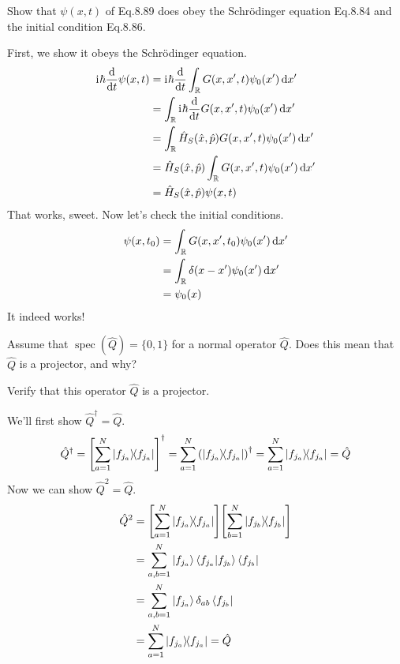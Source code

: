 \documentclass[boxes,pages]{homework}
\makeatletter
\newcommand{\iu}{\mathrm{i}\mkern1mu}
\newcommand{\herm}[1]{{{#1}^\dagger}}
\newcommand{\R}{\mathbb{R}}
\DeclareMathOperator{\spec}{spec}
\numberwithin{@problem}{section}
\makeatother
\begin{document}
\setcounter{section}{8}

\begin{problem}
Show that $\psi(x,t)$ of Eq.8.89 does obey the Schr\"odinger equation Eq.8.84 and the initial condition Eq.8.86.
\end{problem}

\begin{solution}
	First, we show it obeys the Schr\"odinger equation.
	\begin{align*}
		\iu\hbar\dv{t}\psi(x, t) & = \iu\hbar\dv{t}\int_\R\green\psi_0(x')\dd{x'}                \\
		                         & = \int_\R\iu\hbar\dv{t}\green \psi_0(x')\dd{x'}               \\
		                         & = \int_\R \hat{H}_S(\hat{x}, \hat{p})\green \psi_0(x')\dd{x'} \\
		                         & = \hat{H}_S(\hat{x}, \hat{p})\int_\R \green \psi_0(x')\dd{x'} \\
		                         & = \hat{H}_S(\hat{x}, \hat{p})\psi(x, t)
	\end{align*}
	That works, sweet. Now let's check the initial conditions.
	\begin{align*}
		\psi(x, t_0) & = \int_\R\green[t_0]\psi_0(x')\dd{x'}    \\
		             & = \int_\R\delta(x - x')\psi_0(x')\dd{x'} \\
		             & = \psi_0(x)
	\end{align*}
	It indeed works!
\end{solution}

\setcounter{section}{9}

\begin{problem}
Assume that $\spec(\hat{Q}) = \{0,1\}$ for a normal operator $\hat{Q}$. Does this mean that $\hat{Q}$ is a projector, and why?
\end{problem}

\begin{problem}
Verify that this operator $\hat{Q}$ is a projector.
\end{problem}

\begin{solution}
	We'll first show $\herm{\hat{Q}} = \hat{Q}$.
	\begin{equation*}
		\herm{\hat{Q}} = \herm{\qty[\sum_{a = 1}^N\ketbra{f_{j_a}}]} = \sum_{a = 1}^N\herm{\qty(\ketbra{f_{j_a}})} = \sum_{a = 1}^N\ketbra{f_{j_a}} = \hat{Q}
	\end{equation*}
	Now we can show $\hat{Q}^2 = \hat{Q}$.
	\begin{align*}
		\hat{Q}^2 & = \qty[\sum_{a = 1}^N\ketbra{f_{j_a}}]\qty[\sum_{b = 1}^N\ketbra{f_{j_b}}] \\
		          & = \sum_{a, b = 1}^N\ket{f_{j_a}}\braket{f_{j_a}}{f_{j_b}}\bra{f_{j_b}}     \\
		          & = \sum_{a, b = 1}^N\ket{f_{j_a}}\delta_{ab}\bra{f_{j_b}}                   \\
		          & = \sum_{a = 1}^N\ketbra{f_{j_a}} = \hat{Q}
	\end{align*}
\end{solution}
\end{document}
